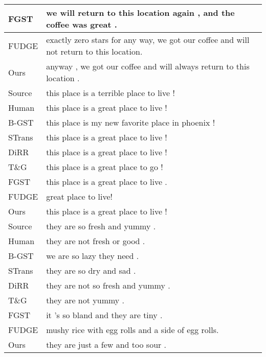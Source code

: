 \documentclass[11pt]{article}
\begin{document}
\begin{table}[ht]
\begin{tabular}{lp{13cm}}
FGST&we will return to this location again , and the coffee was great .\\
\midrule
FUDGE&exactly zero stars for any way, we got our coffee and will not return to this location.\\
Ours&anyway , we got our coffee and will always return to this location .\\
\midrule[1pt]
Source&this place is a terrible place to live !\\
Human&this place is a great place to live !\\
\midrule
B-GST&this place is my new favorite place in phoenix !\\
STrans&this place is a great place to live !\\
DiRR&this place is a great place to live !\\
T\&G&this place is a great place to go !\\
FGST&this place is a great place to live .\\
\midrule
FUDGE&great place to live!\\
Ours&this place is a great place to live !\\
\midrule[1pt]
Source&they are so fresh and yummy .\\
Human&they are not fresh or good .\\
\midrule
B-GST&we are so lazy they need .\\
STrans&they are so dry and sad .\\
DiRR&they are not so fresh and yummy .\\
T\&G&they are not yummy .\\
FGST&it 's so bland and they are tiny .\\
\midrule
FUDGE& mushy rice with egg rolls and a side of egg rolls.\\
Ours&they are just a few and too sour .\\
\midrule[1pt]


\end{tabular}
\end{table}
\end{document}
